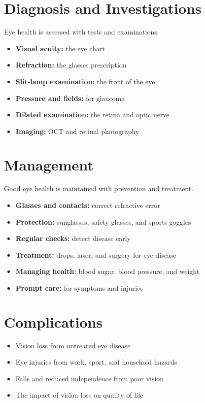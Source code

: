 \section*{Diagnosis and Investigations}
Eye health is assessed with tests and examinations.
\begin{itemize}
    \item \textbf{Visual acuity:} the eye chart
    \item \textbf{Refraction:} the glasses prescription
    \item \textbf{Slit-lamp examination:} the front of the eye
    \item \textbf{Pressure and fields:} for glaucoma
    \item \textbf{Dilated examination:} the retina and optic nerve
    \item \textbf{Imaging:} OCT and retinal photography
\end{itemize}

\section*{Management}
Good eye health is maintained with prevention and treatment.
\begin{itemize}
    \item \textbf{Glasses and contacts:} correct refractive error
    \item \textbf{Protection:} sunglasses, safety glasses, and sports goggles
    \item \textbf{Regular checks:} detect disease early
    \item \textbf{Treatment:} drops, laser, and surgery for eye disease
    \item \textbf{Managing health:} blood sugar, blood pressure, and weight
    \item \textbf{Prompt care:} for symptoms and injuries
\end{itemize}

\section*{Complications}
\begin{itemize}
    \item Vision loss from untreated eye disease
    \item Eye injuries from work, sport, and household hazards
    \item Falls and reduced independence from poor vision
    \item The impact of vision loss on quality of life
\end{itemize}

